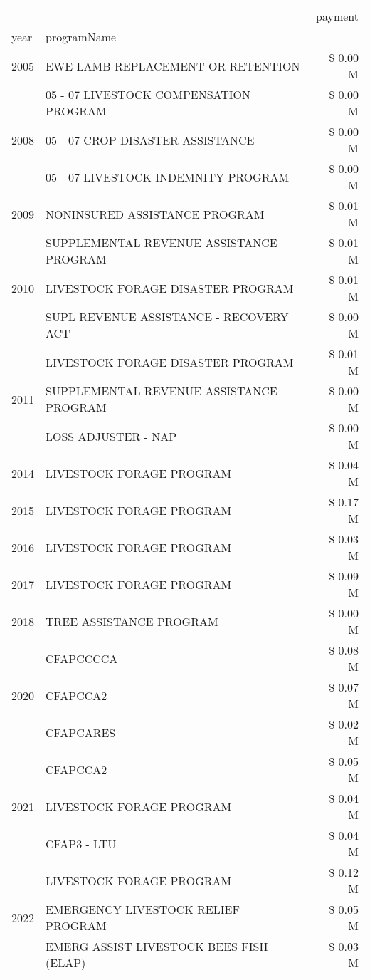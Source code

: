\begin{tabular}{llr}
\toprule
 &  & payment \\
year & programName &  \\
\midrule
2005 & EWE LAMB REPLACEMENT OR RETENTION & \$ 0.00 M \\
\cline{1-3}
\multirow[t]{3}{*}{2008} & 05 - 07 LIVESTOCK COMPENSATION PROGRAM & \$ 0.00 M \\
 & 05 - 07 CROP DISASTER ASSISTANCE & \$ 0.00 M \\
 & 05 - 07 LIVESTOCK INDEMNITY PROGRAM & \$ 0.00 M \\
\cline{1-3}
2009 & NONINSURED ASSISTANCE PROGRAM & \$ 0.01 M \\
\cline{1-3}
\multirow[t]{3}{*}{2010} & SUPPLEMENTAL REVENUE ASSISTANCE PROGRAM & \$ 0.01 M \\
 & LIVESTOCK FORAGE DISASTER PROGRAM & \$ 0.01 M \\
 & SUPL REVENUE ASSISTANCE - RECOVERY ACT & \$ 0.00 M \\
\cline{1-3}
\multirow[t]{3}{*}{2011} & LIVESTOCK FORAGE DISASTER PROGRAM & \$ 0.01 M \\
 & SUPPLEMENTAL REVENUE ASSISTANCE PROGRAM & \$ 0.00 M \\
 & LOSS ADJUSTER - NAP & \$ 0.00 M \\
\cline{1-3}
2014 & LIVESTOCK FORAGE PROGRAM & \$ 0.04 M \\
\cline{1-3}
2015 & LIVESTOCK FORAGE PROGRAM & \$ 0.17 M \\
\cline{1-3}
2016 & LIVESTOCK FORAGE PROGRAM & \$ 0.03 M \\
\cline{1-3}
2017 & LIVESTOCK FORAGE PROGRAM & \$ 0.09 M \\
\cline{1-3}
2018 & TREE ASSISTANCE PROGRAM & \$ 0.00 M \\
\cline{1-3}
\multirow[t]{3}{*}{2020} & CFAPCCCCA & \$ 0.08 M \\
 & CFAPCCA2 & \$ 0.07 M \\
 & CFAPCARES & \$ 0.02 M \\
\cline{1-3}
\multirow[t]{3}{*}{2021} & CFAPCCA2 & \$ 0.05 M \\
 & LIVESTOCK FORAGE PROGRAM & \$ 0.04 M \\
 & CFAP3 - LTU & \$ 0.04 M \\
\cline{1-3}
\multirow[t]{3}{*}{2022} & LIVESTOCK FORAGE PROGRAM & \$ 0.12 M \\
 & EMERGENCY LIVESTOCK RELIEF PROGRAM & \$ 0.05 M \\
 & EMERG ASSIST LIVESTOCK BEES FISH (ELAP) & \$ 0.03 M \\
\cline{1-3}
\bottomrule
\end{tabular}

